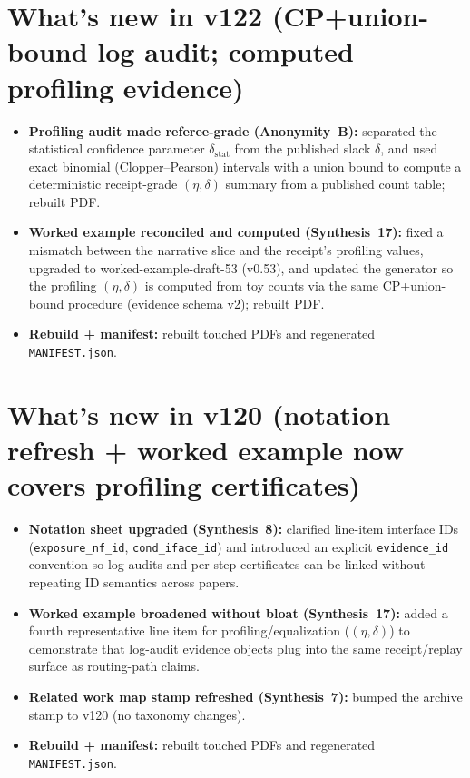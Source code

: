 \documentclass[11pt]{article}
\begin{document}
\section{What's new in v122 (CP+union-bound log audit; computed profiling evidence)}
\begin{itemize}[leftmargin=*]
\item \textbf{Profiling audit made referee-grade (Anonymity~B):} separated the statistical confidence parameter $\delta_{\mathrm{stat}}$ from the published slack $\delta$, and used exact binomial (Clopper--Pearson) intervals with a union bound to compute a deterministic receipt-grade $(\eta,\delta)$ summary from a published count table; rebuilt PDF.
\item \textbf{Worked example reconciled and computed (Synthesis~17):} fixed a mismatch between the narrative slice and the receipt's profiling values, upgraded to worked-example-draft-53 (v0.53), and updated the generator so the profiling $(\eta,\delta)$ is computed from toy counts via the same CP+union-bound procedure (evidence schema v2); rebuilt PDF.
\item \textbf{Rebuild + manifest:} rebuilt touched PDFs and regenerated \texttt{MANIFEST.json}.
\end{itemize}




\section{What's new in v120 (notation refresh + worked example now covers profiling certificates)}
\begin{itemize}[leftmargin=*]
\item \textbf{Notation sheet upgraded (Synthesis~8):} clarified line-item interface IDs (\texttt{exposure\_nf\_id}, \texttt{cond\_iface\_id}) and introduced an explicit \texttt{evidence\_id} convention so log-audits and per-step certificates can be linked without repeating ID semantics across papers.
\item \textbf{Worked example broadened without bloat (Synthesis~17):} added a fourth representative line item for profiling/equalization ($(\eta,\delta)$) to demonstrate that log-audit evidence objects plug into the same receipt/replay surface as routing-path claims.
\item \textbf{Related work map stamp refreshed (Synthesis~7):} bumped the archive stamp to v120 (no taxonomy changes).
\item \textbf{Rebuild + manifest:} rebuilt touched PDFs and regenerated \texttt{MANIFEST.json}.
\end{itemize}
\end{document}
